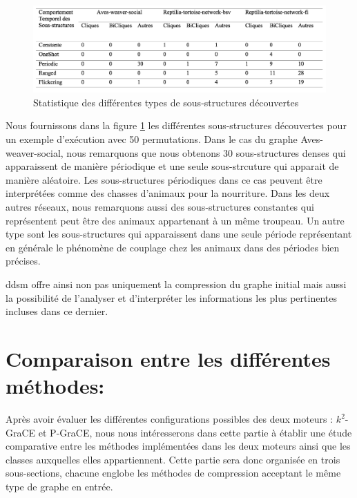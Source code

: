 	\begin{figure}[H]
		
		 \includegraphics[scale=0.38]{ressources/image/statDDSM.png}
			
			
			\caption{Statistique des différentes types de sous-structures découvertes}
			\label{fig:stat-DDSM}
		
	\end{figure}	
	
	Nous fournissons dans la figure \ref{fig:stat-DDSM} les différentes sous-structures découvertes pour un exemple d'exécution avec 50 permutations. Dans le cas du graphe Aves-weaver-social, nous remarquons que nous obtenons 30 sous-structures denses qui apparaissent de manière périodique et une seule sous-strcuture qui apparait de manière aléatoire. 
	Les sous-structures périodiques dans ce cas peuvent être interprétées comme des chasses d'animaux pour la nourriture.
	Dans les deux autres réseaux, nous remarquons aussi des sous-structures constantes qui représentent peut être des animaux appartenant à un même troupeau. 
	 Un autre type sont les sous-structures qui apparaissent dans une seule période représentant en générale le phénomène de couplage chez les animaux dans des périodes bien précises.
	
	\gls{ddsm} offre ainsi non pas uniquement la compression du graphe initial mais aussi la possibilité de l'analyser et d'interpréter les informations les plus pertinentes incluses dans ce dernier.
	
	\section{Comparaison entre les différentes méthodes:}
	
	Après avoir évaluer les différentes configurations possibles des deux moteurs : $k^2$-GraCE et P-GraCE, nous nous intéresserons dans cette partie à établir une étude comparative entre les méthodes implémentées dans les deux moteurs ainsi que les classes auxquelles elles appartiennent. Cette partie sera donc organisée en trois sous-sections, chacune englobe les méthodes de compression acceptant le même type de graphe en entrée.
	
